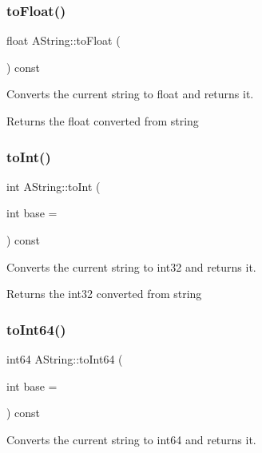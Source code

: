 \subsubsection{\texorpdfstring{toFloat()}{toFloat()}}
{\footnotesize\ttfamily float A\+String\+::to\+Float (\begin{DoxyParamCaption}{ }\end{DoxyParamCaption}) const}



Converts the current string to float and returns it. 

\begin{DoxyReturn}{Returns}
the float converted from string 
\end{DoxyReturn}
\mbox{\label{class_a_string_a037e4cedecdb1d68614cf3f199f85834}} 
\subsubsection{\texorpdfstring{toInt()}{toInt()}}
{\footnotesize\ttfamily int A\+String\+::to\+Int (\begin{DoxyParamCaption}\item[{int}]{base = {} }\end{DoxyParamCaption}) const}



Converts the current string to int32 and returns it. 

\begin{DoxyReturn}{Returns}
the int32 converted from string 
\end{DoxyReturn}
\mbox{\label{class_a_string_affa719b95e059f7c0ef8eb43b3a892bf}} 
\subsubsection{\texorpdfstring{toInt64()}{toInt64()}}
{\footnotesize\ttfamily int64 A\+String\+::to\+Int64 (\begin{DoxyParamCaption}\item[{int}]{base = {} }\end{DoxyParamCaption}) const}



Converts the current string to int64 and returns it. 


